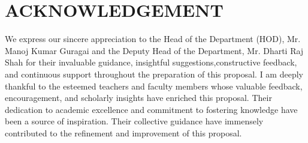 \chapter*{ACKNOWLEDGEMENT}

We express our sincere appreciation to the Head of the Department (HOD), Mr. Manoj
Kumar Guragai and the Deputy Head of the Department, Mr. Dharti Raj Shah for their invaluable
guidance, insightful suggestions,constructive feedback, and continuous support
throughout the preparation of this proposal.
I am deeply thankful to the esteemed teachers and faculty members whose valuable
feedback, encouragement, and scholarly insights have enriched this proposal. Their
dedication to academic excellence and commitment to fostering knowledge have been a
source of inspiration. Their collective guidance have immensely contributed to the
refinement and improvement of this proposal.





\vspace{1cm}




